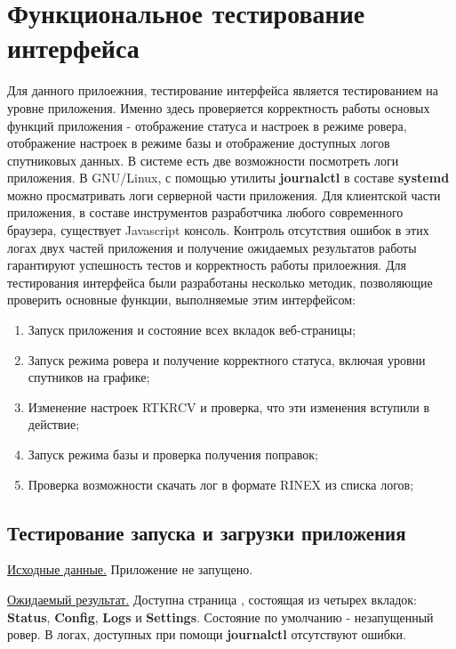 \section{Функциональное тестирование интерфейса} \label{sect4_2}

Для данного прилоежния, тестирование интерфейса является тестированием на уровне приложения. Именно здесь проверяется корректность работы основых функций приложения - отображение статуса и настроек в режиме ровера, отображение настроек в режиме базы и отображение доступных логов спутниковых данных. В системе есть две возможности посмотреть логи приложения. В GNU/Linux, с помощью утилиты \textbf{journalctl} в составе \textbf{systemd} можно просматривать логи серверной части приложения. Для клиентской части приложения, в составе инструментов разработчика любого современного браузера, существует Javascript консоль. Контроль отсутствия ошибок в этих логах двух частей приложения и получение ожидаемых результатов работы гарантируют успешность тестов и корректность работы прилоежния. Для тестирования интерфейса были разработаны несколько методик, позволяющие проверить основные функции, выполняемые этим интерфейсом:

\begin{enumerate}
  \item Запуск приложения и состояние всех вкладок веб-страницы;
  \item Запуск режима ровера и получение корректного статуса, включая уровни спутников на графике;
  \item Изменение настроек RTKRCV и проверка, что эти изменения вступили в действие;
  \item Запуск режима базы и проверка получения поправок;
  \item Проверка возможности скачать лог в формате RINEX из списка логов;
\end{enumerate}


\subsection{Тестирование запуска и загрузки приложения} \label{subsect4_2_1}

\underline{Исходные данные.} Приложение не запущено.

\underline{Ожидаемый результат.} Доступна страница , состоящая из четырех вкладок: \textbf{Status}, \textbf{Config}, \textbf{Logs} и \textbf{Settings}. Состояние по умолчанию - незапущенный ровер. В логах, доступных при помощи \textbf{journalctl} отсутствуют ошибки.

